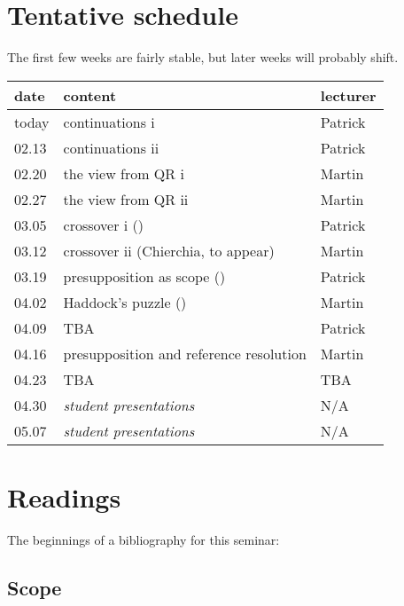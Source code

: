 \documentclass[nols,twoside,nofonts,nobib,nohyper]{tufte-handout}
\begin{document}
\section{Tentative schedule}

The first few weeks are fairly stable, but later weeks will probably
shift.

\begin{table}[!ht]
\begin{tabular}{@{}lll@{}}
\toprule
  date & content  & lecturer  \\ \midrule
  today & continuations i &  Patrick \\
  02.13 & continuations ii & Patrick  \\
  02.20 & the view from QR i & Martin  \\
  02.27 & the view from QR ii & Martin  \\
  03.05 & crossover i (\citealt{shanBarker2006}) & Patrick \\
  03.12 & crossover ii (Chierchia, to appear) &  Martin \\
  03.19 & presupposition as scope (\citealt{grove2019}) & Patrick \\
  04.02 & Haddock's puzzle (\citealt{bumford2017}) & Martin \\
  04.09 & TBA & Patrick  \\
  04.16 & presupposition and reference resolution & Martin  \\
  04.23 & TBA & TBA \\
  04.30 & \textit{student presentations} & N/A  \\
  05.07 & \textit{student presentations} & N/A \\
 \bottomrule
\end{tabular}
\end{table}

\section{Readings}

The beginnings of a bibliography for this seminar:

\subsection{Scope}
\end{document}
